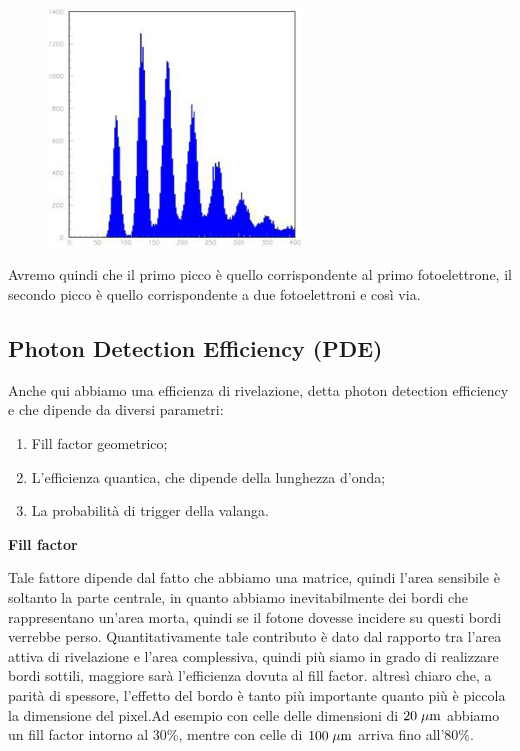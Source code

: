 \begin{figure}[H]
   \centering
   \includegraphics[width=0.6\textwidth]{immagini/spettro_SiPM.png}
\end{figure}

Avremo quindi che il primo picco è quello corrispondente al primo fotoelettrone, il secondo picco è quello corrispondente a due fotoelettroni e così via.

\subsection{Photon Detection Efficiency (PDE)}
Anche qui abbiamo una efficienza di rivelazione, detta photon detection efficiency e che dipende da diversi parametri:
\begin{enumerate}
   \item Fill factor geometrico;
   \item L'efficienza quantica, che dipende della lunghezza d'onda;
   \item La probabilità di trigger della valanga.
\end{enumerate}

\textbf{Fill factor}

Tale fattore dipende dal fatto che abbiamo una matrice, quindi l'area sensibile è soltanto la parte centrale, in quanto abbiamo inevitabilmente dei bordi che rappresentano un'area morta, quindi se il fotone dovesse incidere su questi bordi verrebbe perso. Quantitativamente tale contributo è dato dal rapporto tra l'area attiva di rivelazione e l'area complessiva, quindi più siamo in grado di realizzare bordi sottili, maggiore sarà l'efficienza dovuta al fill factor. \E altresì chiaro che, a parità di spessore, l'effetto del bordo è tanto più importante quanto più è piccola la dimensione del pixel.Ad esempio con celle delle dimensioni di $20 \; \rm \mu m$ abbiamo un fill factor intorno al 30\%, mentre con celle di $100 \; \rm \mu m$ arriva fino all'80\%.

